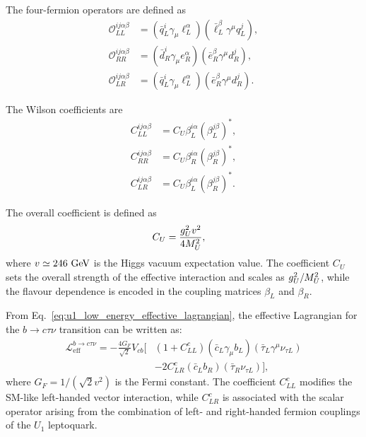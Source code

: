 The four-fermion operators are defined as
\begin{align*}
\mathcal{O}_{LL}^{ij\alpha\beta}
&=
\left(
\bar{q}_{L}^{i}\gamma_{\mu}\ell_{L}^{\alpha}
\right)
\left(
\bar{\ell}_{L}^{\beta}\gamma^{\mu}q_{L}^{j}
\right),
\\
\mathcal{O}_{RR}^{ij\alpha\beta}
&=
\left(
\bar{d}_{R}^{i}\gamma_{\mu}e_{R}^{\alpha}
\right)
\left(
\bar{e}_{R}^{\beta}\gamma^{\mu}d_{R}^{j}
\right),
\\
\mathcal{O}_{LR}^{ij\alpha\beta}
&=
\left(
\bar{q}_{L}^{i}\gamma_{\mu}\ell_{L}^{\alpha}
\right)
\left(
\bar{e}_{R}^{\beta}\gamma^{\mu}d_{R}^{j}
\right).
\end{align*}

The Wilson coefficients are
\begin{align*}
C_{LL}^{ij\alpha\beta}
&=
C_{U}\beta_{L}^{i\alpha}
\left(
\beta_{L}^{j\beta}
\right)^{*},
\\
C_{RR}^{ij\alpha\beta}
&=
C_{U}\beta_{R}^{i\alpha}
\left(
\beta_{R}^{j\beta}
\right)^{*},
\\
C_{LR}^{ij\alpha\beta}
&=
C_{U}\beta_{L}^{i\alpha}
\left(
\beta_{R}^{j\beta}
\right)^{*}.
\end{align*}

The overall coefficient is defined as
\begin{align*}
C_{U}
&=
\frac{g_U^{2}v^{2}}{4M_U^{2}},
\end{align*}
where $v\simeq246~\mathrm{GeV}$ is the Higgs vacuum expectation value.
The coefficient $C_{U}$ sets the overall strength of the effective interaction and scales as $g_U^{2}/M_U^{2}$, while the flavour dependence is encoded in the coupling matrices $\beta_{L}$ and $\beta_{R}$.

From Eq.~\eqref{eq:u1_low_energy_effective_lagrangian}, the effective Lagrangian for the $b\to c\tau\nu$ transition can be written as:
\begin{align*}
    \mathcal{L}_{\mathrm{eff}}^{b\rightarrow c\tau\nu}
    =
    -\frac{4G_{F}}{\sqrt{2}}V_{cb}
    \bigg[
        &
        \left(
            1+C_{LL}^{c}
        \right)
        \left(
            \bar{c}_{L}\gamma_{\mu}b_{L}
        \right)
        \left(
            \bar{\tau}_{L}\gamma^{\mu}\nu_{\tau L}
        \right)
        \nonumber\\
        &
        -
        2C_{LR}^{c}
        \left(
            \bar{c}_{L}b_{R}
        \right)
        \left(
            \bar{\tau}_{R}\nu_{\tau L}
        \right)
    \bigg],
\end{align*}
where $G_{F}=1/(\sqrt{2}v^{2})$ is the Fermi constant.
The coefficient $C_{LL}^{c}$ modifies the SM-like left-handed vector
interaction, while $C_{LR}^{c}$ is associated with the scalar operator arising from the combination of left- and right-handed fermion couplings
of the $U_{1}$ leptoquark.

